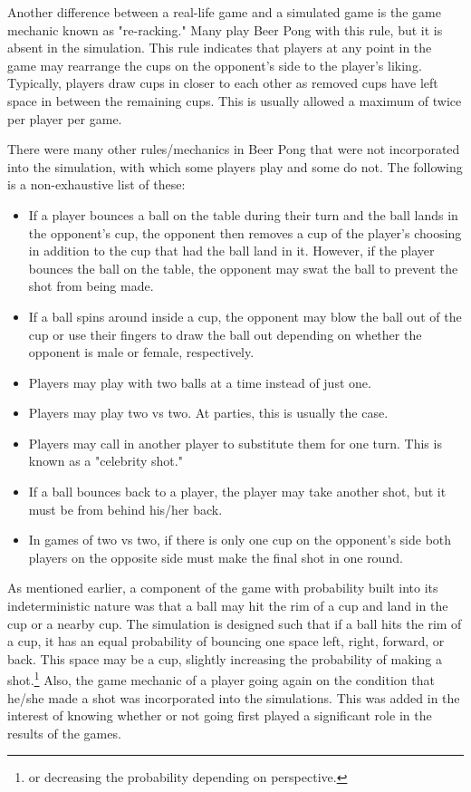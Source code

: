 \documentclass{article}
\begin{document}
Another difference between a real-life game and a simulated game is the game mechanic known as "re-racking." Many play Beer Pong with this rule, but it is absent in the simulation. This rule indicates that players at any point in the game may rearrange the cups on the opponent's side to the player's liking. Typically, players draw cups in closer to each other as removed cups have left space in between the remaining cups. This is usually allowed a maximum of twice per player per game. 

There were many other rules/mechanics in Beer Pong that were not incorporated into the simulation, with which some players play and some do not. The following is a non-exhaustive list of these:
\begin{itemize}
	\item If a player bounces a ball on the table during their turn and the ball lands in the opponent's cup, the opponent then removes a cup of the player's choosing in addition to the cup that had the ball land in it. However, if the player bounces the ball on the table, the opponent may swat the ball to prevent the shot from being made.
	\item If a ball spins around inside a cup, the opponent may blow the ball out of the cup or use their fingers to draw the ball out depending on whether the opponent is male or female, respectively.
	\item Players may play with two balls at a time instead of just one.
	\item Players may play two vs two. At parties, this is usually the case.
	\item Players may call in another player to substitute them for one turn. This is known as a "celebrity shot."
	\item If a ball bounces back to a player, the player may take another shot, but it must be from behind his/her back.
	\item In games of two vs two, if there is only one cup on the opponent's side both players on the opposite side must make the final shot in one round.
\end{itemize}

As mentioned earlier, a component of the game with probability built into its indeterministic nature was that a ball may hit the rim of a cup and land in the cup or a nearby cup. The simulation is designed such that if a ball hits the rim of a cup, it has an equal probability of bouncing one space left, right, forward, or back. This space may be a cup, slightly increasing the probability of making a shot.\footnote{or decreasing the probability depending on perspective.} Also, the game mechanic of a player going again on the condition that he/she made a shot was incorporated into the simulations. This was added in the interest of knowing whether or not going first played a significant role in the results of the games. 
\end{document}
